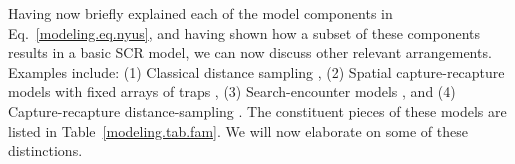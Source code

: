 Having now briefly explained each of the model components in
Eq.~\ref{modeling.eq.nyus}, and having
shown how a subset of these components results in a basic SCR model,
we can now discuss other relevant arrangements.
Examples include:
(1) Classical distance sampling \citep{buckland_etal:2001, borchers_etal:2002},
(2) Spatial capture-recapture models with fixed arrays of traps
    \citep{efford:2004, borchers_efford:2008, royle_etal:2009ecol,
           royle_etal:2009jae,
           gardner_etal:2010ecol,royle_etal:2011jwm},
(3) Search-encounter models \citep{royle_young:2008,
  royle_etal:2011mee}, and
(4) Capture-recapture distance-sampling \citep{borchers_etal:1998}.
The constituent pieces of these models are listed in
Table~\ref{modeling.tab.fam}. We will now elaborate on some of
these distinctions.
